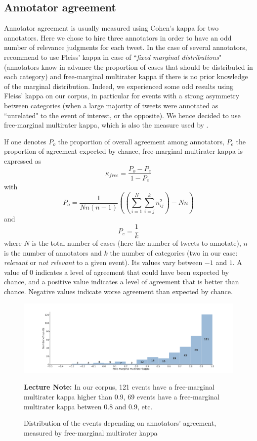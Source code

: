 	\subsection{Annotator agreement}

Annotator agreement is usually measured using Cohen's kappa for two annotators. Here we chose to hire three annotators in order to have an odd number of relevance judgments for each tweet. In the case of several annotators, \citet{randolph_free_2005} recommend to use Fleiss' kappa \citep{fleiss_measuring_1971} in case of ``\textit{fixed marginal distributions}" (annotators know in advance the proportion of cases that should be distributed in each category) and free-marginal multirater kappa \citep{randolph_free_2005} if there is no prior knowledge of the marginal distribution. Indeed, we experienced some odd results using Fleiss' kappa on our corpus, in particular for events with a strong asymmetry between categories (when a large majority of tweets were annotated as ``unrelated" to the event of interest, or the opposite). We hence decided to use free-marginal multirater kappa, which is also the measure used by \citet{mcminn_building_2013}.


If one denotes $P_o$ the proportion of overall agreement among annotators, $P_e$ the proportion of agreement expected by chance, free-marginal multirater kappa is expressed as 
$$
\kappa_{free} = \frac{P_o - P_e}{1 - P_e}
$$
with 
$$
P_o = \frac{1}{Nn(n-1)}((\sum_{i=1}^N\sum_{i=j}^kn_{ij}^2)-Nn)
$$
and
$$
P_e = \frac{1}{k}
$$
where $N$ is the total number of cases (here the number of tweets to annotate), $n$ is the number of annotators and $k$ the number of categories (two in our case: \textit{relevant} or \textit{not relevant} to a given event). Its values vary between $-1$ and $1$. A value of $0$ indicates a level of agreement that could have been expected by chance, and a positive value indicates a level of agreement that is better than chance. Negative values indicate worse agreement than expected by chance.


\begin{figure}
\begin{center}
\includegraphics[width=1\textwidth]{figures/HistogramEventsDistributionByKappa.pdf}
\end{center}
{\scriptsize \textbf{Lecture Note:} In our corpus, 121 events have a free-marginal multirater kappa higher than 0.9, 69 events have a free-marginal multirater kappa between 0.8 and 0.9, etc.
}
\caption{Distribution of the events depending on annotators' agreement, measured by free-marginal multirater kappa}
\label{Figure:HistogramEventsByKappa}
\end{figure}

